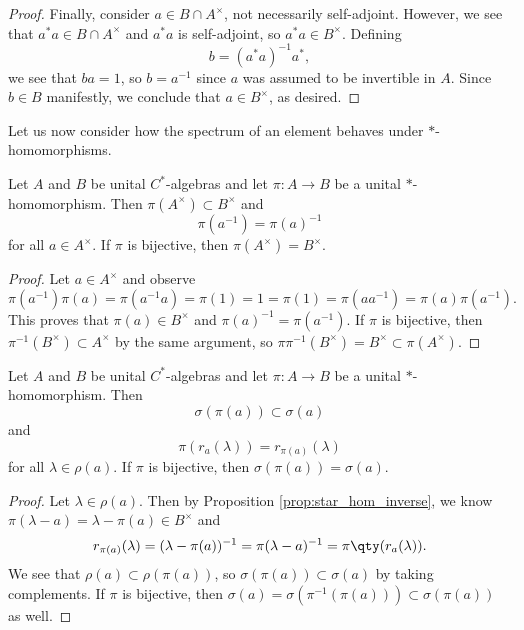 \begin{proof}
Finally, consider $a \in B \cap A^\times$, not necessarily self-adjoint. However, we see that $a^*a \in B \cap A^\times$ and $a^*a$ is self-adjoint, so $a^*a \in B^\times$. Defining 
\begin{equation}
b = (a^* a)^{-1}a^*,
\end{equation}
we see that $ba = 1$, so $b = a^{-1}$ since $a$ was assumed to be invertible in $A$. Since $b \in B$ manifestly, we conclude that $a \in B^\times$, as desired.
\end{proof}

Let us now consider how the spectrum of an element behaves under $*$-homomorphisms. 

\begin{proposition}\label{prop:star_hom_inverse}
Let $A$ and $B$ be unital $C^*$-algebras and let $\pi:A \rightarrow B$ be a unital $*$-homomorphism. Then $\pi(A^\times)\subset B^\times$ and
\begin{equation}
\pi(a^{-1}) = \pi(a)^{-1}
\end{equation}
for all $a \in A^\times$. If $\pi$ is bijective, then $\pi(A^\times) = B^\times$.
\end{proposition}

\begin{proof}
Let $a \in A^\times$ and observe
\begin{equation}
\pi(a^{-1})\pi(a) = \pi(a^{-1}a) = \pi(1) = 1 =\pi(1) = \pi(aa^{-1}) = \pi(a)\pi(a^{-1}).
\end{equation}
This proves that $\pi(a) \in B^\times$ and $\pi(a)^{-1} = \pi(a^{-1})$. If $\pi$ is bijective, then $\pi^{-1}(B^\times) \subset A^\times$ by the same argument, so $\pi \pi^{-1}(B^\times) = B^\times \subset \pi(A^\times)$.
\end{proof}

\begin{proposition}\label{prop:star_hom_spectrum}
Let $A$ and $B$ be unital $C^*$-algebras and let $\pi:A \rightarrow B$ be a unital $*$-homomorphism. Then
\begin{equation}
\sigma(\pi(a)) \subset \sigma(a)
\end{equation}
and
\begin{equation}
\pi(r_a(\lambda)) = r_{\pi(a)}(\lambda)
\end{equation}
for all $\lambda \in \rho(a)$. If $\pi$ is bijective, then $\sigma(\pi(a)) = \sigma(a)$.
\end{proposition}

\begin{proof}
Let $\lambda \in \rho(a)$. Then by Proposition \ref{prop:star_hom_inverse}, we know $\pi(\lambda - a) = \lambda - \pi(a) \in B^\times$ and 
\begin{equation}
r_{\pi(a)}(\lambda) = (\lambda - \pi(a))^{-1} = \pi(\lambda - a)^{-1} = \pi\qty(r_a(\lambda)).
\end{equation}
We see that $\rho(a) \subset \rho(\pi(a))$, so $\sigma(\pi(a)) \subset \sigma(a)$ by taking complements. If $\pi$ is bijective, then $\sigma(a) = \sigma(\pi^{-1}(\pi(a))) \subset \sigma(\pi(a))$ as well.
\end{proof}



